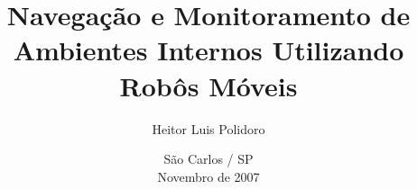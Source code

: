 \documentclass[12pt,a4paper,twoside,openright,final]{report}
\begin{document}
	\title{Navegação e Monitoramento de Ambientes Internos Utilizando Robôs Móveis}
	\author{Heitor Luis Polidoro}
	\date{São Carlos / SP\\Novembro de 2007}
	\maketitle

	\cleardoublepage
	\setcounter{page}{1}
	
	
	
	
	
	\tableofcontents
	\listoffigures
	\listoftables
	\listofalgorithms
	
	\cleardoublepage
	\setcounter{page}{1}
	
	
	
	
	
	
	
	\pagestyle{referencest}
%	
	
	 
	
	\appendix
	
\end{document}

